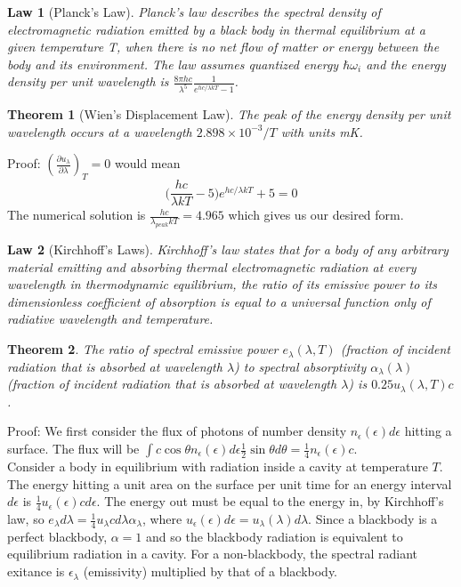 \documentclass[a4paper]{article}
\theoremstyle{new}
\newtheorem{law}{Law}[section]
\newtheorem{thm}{Theorem}[section]
\begin{document}
\begin{law}[Planck's Law]
Planck's law describes the spectral density of electromagnetic radiation emitted by a black body in thermal equilibrium at a given temperature T, when there is no net flow of matter or energy between the body and its environment. The law assumes quantized energy $\hbar\omega_i$ and the energy density per unit wavelength is $\frac{8\pi hc}{\lambda^5}\frac{1}{e^{hc/\lambda kT}-1}$.
\end{law}
\begin{thm}[Wien's Displacement Law]
The peak of the energy density per unit wavelength occurs at a wavelength $2.898\times10^{-3}/T$ with units mK.
\end{thm}
Proof: $(\frac{\partial u_\lambda}{\partial\lambda})_T=0$ would mean
$$\bigg(\frac{hc}{\lambda kT}-5\bigg)e^{hc/\lambda kT}+5=0$$
The numerical solution is $\frac{hc}{\lambda_{peak}kT}=4.965$ which gives us our desired form.
\begin{law}[Kirchhoff's Laws]
Kirchhoff's law states that for a body of any arbitrary material emitting and absorbing thermal electromagnetic radiation at every wavelength in thermodynamic equilibrium, the ratio of its emissive power to its dimensionless coefficient of absorption is equal to a universal function only of radiative wavelength and temperature.
\end{law}
\begin{thm}
The ratio of spectral emissive power $e_\lambda(\lambda,T)$ (fraction of incident radiation that is absorbed at wavelength $\lambda$) to spectral absorptivity $\alpha_\lambda(\lambda)$ (fraction of incident radiation that is absorbed at wavelength $\lambda$) is $0.25u_\lambda(\lambda,T)c$.
\end{thm}
Proof: We first consider the flux of photons of number density $n_\epsilon(\epsilon)d\epsilon$ hitting a surface. The flux will be $\int c\cos\theta n_\epsilon(\epsilon)d\epsilon\frac{1}{2}\sin\theta d\theta=\frac{1}{4}n_\epsilon(\epsilon)c$.\\[5pt]
Consider a body in equilibrium with radiation inside a cavity at temperature $T$. The energy hitting a unit area on the surface per unit time for an energy interval $d\epsilon$ is $\frac{1}{4}u_\epsilon(\epsilon) cd\epsilon$. The energy out must be equal to the energy in, by Kirchhoff's law, so $e_\lambda d\lambda=\frac{1}{4}u_\lambda cd\lambda \alpha_\lambda$, where $u_\epsilon(\epsilon)d\epsilon=u_\lambda(\lambda)d\lambda$. Since a blackbody is a perfect blackbody, $\alpha=1$ and so the blackbody radiation is equivalent to equilibrium radiation in a cavity. For a non-blackbody, the spectral radiant exitance is $\epsilon_\lambda$ (emissivity) multiplied by that of a blackbody. 
\end{document}
